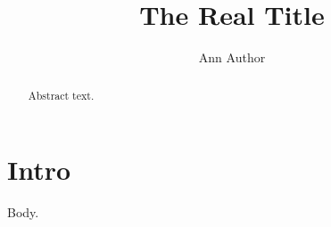 \documentclass{absmkt}
\title{The Real Title}\author{Ann Author}
\begin{document}
\begin{abstract}
Abstract text.
\end{abstract}
\section{Intro}
Body.
\end{document}
